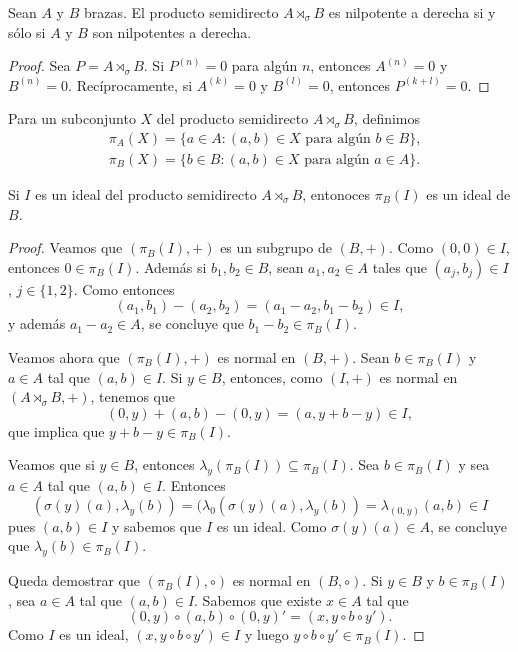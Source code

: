 \begin{theorem}
	Sean $A$ y $B$ brazas. El producto semidirecto
	$A\rtimes_{\sigma}B$ es nilpotente a derecha si y sólo si $A$ y $B$ son nilpotentes a derecha. 
\end{theorem}

\begin{proof}
	Sea $P=A\rtimes_{\sigma}B$. 
	Si $P^{(n)}=0$ para algún $n$, entonces $A^{(n)}=0$ y $B^{(n)}=0$. 
	Recíprocamente, si $A^{(k)}=0$ y $B^{(l)}=0$, entonces $P^{(k+l)}=0$.
\end{proof}


Para un subconjunto $X$ del producto semidirecto $A\rtimes_{\sigma}B$, definimos
\begin{align*}
    &\pi_A(X)=\{a\in A:(a,b)\in X\text{ para algún $b\in B$}\},\\
    &\pi_B(X)=\{b\in B:(a,b)\in X\text{ para algún $a\in A$}\}.
\end{align*}

\begin{lemma}
Si $I$ es un ideal del producto semidirecto $A\rtimes_{\sigma}B$, entonoces 
$\pi_B(I)$ es un ideal de $B$.
\end{lemma}

\begin{proof}
    Veamos que $(\pi_B(I),+)$ es un subgrupo de $(B,+)$. Como $(0,0)\in I$, entonces $0\in\pi_B(I)$. Además si $b_1,b_2\in B$, sean 
    $a_1,a_2\in A$ tales que $(a_j,b_j)\in I$, $j\in\{1,2\}$. Como entonces
    \[
    (a_1,b_1)-(a_2,b_2)=(a_1-a_2,b_1-b_2)\in I,
    \]
    y además $a_1-a_2\in A$, se concluye que $b_1-b_2\in \pi_B(I)$. 
    
    Veamos ahora que $(\pi_B(I),+)$ es normal en $(B,+)$. Sean $b\in \pi_B(I)$ y $a\in A$ 
    tal que $(a,b)\in I$. Si $y\in B$, entonces, como $(I,+)$ es normal en $(A\rtimes_{\sigma}B,+)$, tenemos que
    \[
    (0,y)+(a,b)-(0,y)=(a,y+b-y)\in I,
    \]
    que implica que $y+b-y\in \pi_B(I)$.
    
    Veamos que si $y\in B$, entonces $\lambda_y(\pi_B(I))\subseteq \pi_B(I)$. Sea $b\in\pi_B(I)$ y sea $a\in A$ tal que $(a,b)\in I$. Entonces
    \[
    (\sigma(y)(a),\lambda_y(b))=(\lambda_0(\sigma(y)(a),\lambda_y(b))=\lambda_{(0,y)}(a,b)\in I
    \]
    pues $(a,b)\in I$ y sabemos que $I$ es un ideal. Como $\sigma(y)(a)\in A$, se concluye que
    $\lambda_y(b)\in \pi_B(I)$.

    Queda demostrar que $(\pi_B(I),\circ)$ es normal en $(B,\circ)$. Si $y\in B$ y $b\in \pi_B(I)$, 
    sea $a\in A$ tal que $(a,b)\in I$. Sabemos que existe $x\in A$ tal que 
    \[
    (0,y)\circ (a,b)\circ (0,y)'=(x,y\circ b\circ y').
    \]
    Como $I$ es un ideal, $(x,y\circ b\circ y')\in I$ y luego $y\circ b\circ y'\in \pi_B(I)$. 
\end{proof}

